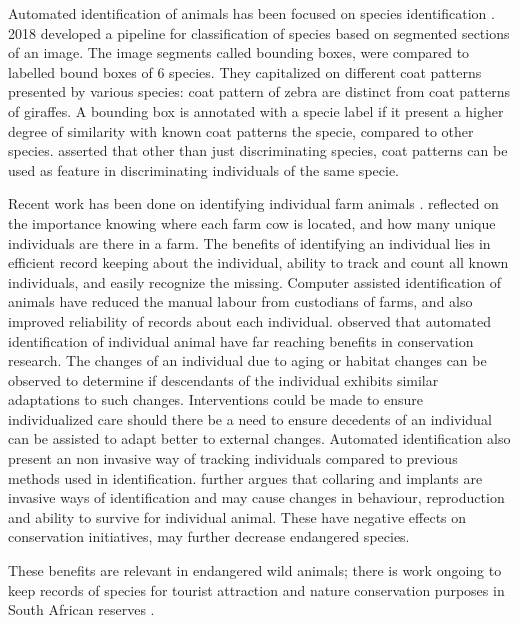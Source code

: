 Automated identification of animals has been focused on species identification \cite{parham2018animal}. \cite{norouzzadeh2018automatically} 2018 developed a pipeline for classification of species based on segmented sections of an image. The image segments called bounding boxes, were compared to labelled bound boxes of 6 species. They capitalized on different coat patterns presented by various species: coat pattern of zebra are distinct from coat patterns of giraffes. A bounding box is annotated with a specie label if it present a higher degree of similarity with known coat patterns the specie, compared to other species. \citet{kuhl2013animal} asserted that other than just discriminating species, coat patterns can be used as feature in discriminating individuals of the same specie.

Recent work has been done on identifying individual farm animals \cite{kumar2017real}. \citet{kumar2017real} reflected on the importance knowing where each farm cow is located, and how many unique individuals are there in a farm. The benefits of identifying an individual lies in efficient record keeping about the individual, ability to track and count all known individuals, and easily recognize the missing. Computer assisted  identification of animals have reduced the manual labour from custodians of farms, and also improved reliability of records about each individual. \citet{kuhl2013animal} observed that automated identification of individual animal have far reaching benefits in conservation research. The changes of an individual due to aging or habitat changes can be observed to determine if descendants of the individual exhibits similar adaptations to such changes. Interventions could be made to ensure individualized care should there be a need to ensure decedents of an individual can be assisted to adapt better to external changes. Automated identification also present an non invasive way of tracking individuals compared to previous methods used in identification. \citet{kuhl2013animal} further argues that collaring and implants are invasive ways of identification and may cause changes in behaviour, reproduction and ability to survive for individual animal. These have negative effects on conservation initiatives, may further decrease endangered species.


These benefits are relevant in endangered wild animals; there is work ongoing to keep records of species for tourist attraction and nature conservation purposes in South African reserves \cite{marnewick2008evaluating}.


